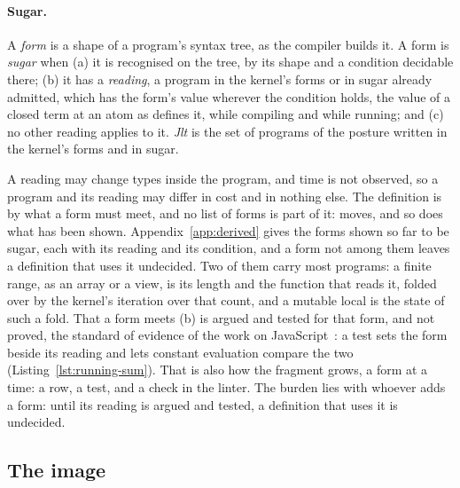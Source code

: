 \paragraph{Sugar.}
\label{sec:kernel:derived}
\begin{definition}
\label{def:sugar}
A \emph{form} is a shape of a program's syntax tree, as the compiler builds it.
A form is \emph{sugar} when
(a) it is recognised on the tree, by its shape and a condition decidable there;
(b) it has a \emph{reading}, a program in the kernel's forms or in sugar already admitted, which has the form's value wherever the condition holds, the value of a closed term at an atom as  defines it, while compiling and while running; and
(c) no other reading applies to it.
\emph{Jlt} is the set of programs of the posture written in the kernel's forms and in sugar.
\end{definition}

\noindent A reading may change types inside the program, and time is not observed, so a program and its reading may differ in cost and in nothing else.
The definition is by what a form must meet, and no list of forms is part of it: \Cpp{} moves, and so does what has been shown.
Appendix~\ref{app:derived} gives the forms shown so far to be sugar, each with its reading and its condition, and a form not among them leaves a definition that uses it undecided.
Two of them carry most programs: a finite range, as an array or a view, is its length and the function that reads it, folded over by the kernel's iteration over that count, and a mutable local is the state of such a fold.
That a form meets (b) is argued and tested for that form, and not proved, the standard of evidence of the work on JavaScript~\cite{guha2010essence}: a test sets the form beside its reading and lets constant evaluation compare the two (Listing~\ref{lst:running-sum}).
That is also how the fragment grows, a form at a time: a row, a test, and a check in the linter.
The burden lies with whoever adds a form: until its reading is argued and tested, a definition that uses it is undecided.

\subsection{The image}
\label{sec:translation}

